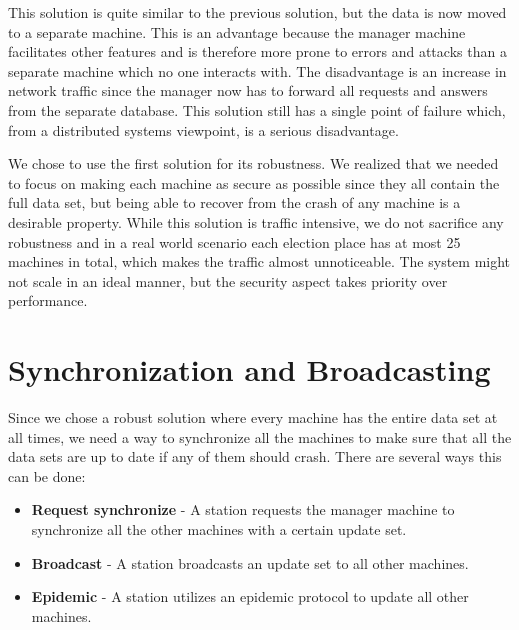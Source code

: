 \documentclass[a4paper]{report}
\begin{document}
\begin{description}[style=nextline]
\item [A separate database is located in the election venue and the management machine takes the role as a proxy to facilitate communication between stations and the database.] This solution is quite similar to the previous solution, but the data is now moved to a separate machine. This is an advantage because the manager machine facilitates other features and is therefore more prone to errors and attacks than a separate machine which no one interacts with. The disadvantage is an increase in network traffic since the manager now has to forward all requests and answers from the separate database. This solution still has a single point of failure which, from a distributed systems viewpoint, is a serious disadvantage.

\end{description}

We chose to use the first solution for its robustness. We realized that we needed to focus on making each machine as secure as possible since they all contain the full data set, but being able to recover from the crash of any machine is a desirable property. While this solution is traffic intensive, we do not sacrifice any robustness and in a real world scenario each election place has at most 25 machines in total, which makes the traffic almost unnoticeable. The system might not scale in an ideal manner, but the security aspect takes priority over performance.

\chapter{Synchronization and Broadcasting}
Since we chose a robust solution where every machine has the entire data set at all times, we need a way to synchronize all the machines to make sure that all the data sets are up to date if any of them should crash. There are several ways this can be done:

\begin{itemize}
\item  \textbf{Request synchronize}
- A station requests the manager machine to synchronize all the other machines with a certain update set.
\item \textbf{Broadcast}
- A station broadcasts an update set to all other machines.
\item \textbf{Epidemic}
- A station utilizes an epidemic protocol to update all other machines.
\end{itemize}
\end{document}
